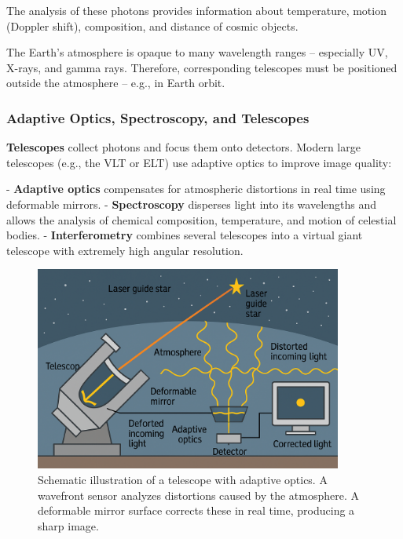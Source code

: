 The analysis of these photons provides information about temperature, motion (Doppler shift), composition, and distance of cosmic objects.

\vspace{1em}
\begin{tcolorbox}[physikbox, title=Why Don’t All Photons Reach Earth?] 
	\label{box:photonen auf erde}
	\small
	The Earth’s atmosphere is opaque to many wavelength ranges – especially UV, X-rays, and gamma rays. Therefore, corresponding telescopes must be positioned outside the atmosphere – e.g., in Earth orbit.
\end{tcolorbox}
\newpage
\noindent
\subsubsection{Adaptive Optics, Spectroscopy, and Telescopes}

\textbf{Telescopes} collect photons and focus them onto detectors. Modern large telescopes (e.g., the VLT or ELT) use adaptive optics to improve image quality:

- \textbf{Adaptive optics} compensates for atmospheric distortions in real time using deformable mirrors.
- \textbf{Spectroscopy} disperses light into its wavelengths and allows the analysis of chemical composition, temperature, and motion of celestial bodies.
- \textbf{Interferometry} combines several telescopes into a virtual giant telescope with extremely high angular resolution.
\begin{figure}[H]
	\centering
	\includegraphics[width=0.9\textwidth]{bilder/Teleskop.png}
	\caption{Schematic illustration of a telescope with adaptive optics. A wavefront sensor analyzes distortions caused by the atmosphere. A deformable mirror surface corrects these in real time, producing a sharp image.}
	\label{fig:adaptive_optik}
\end{figure}

